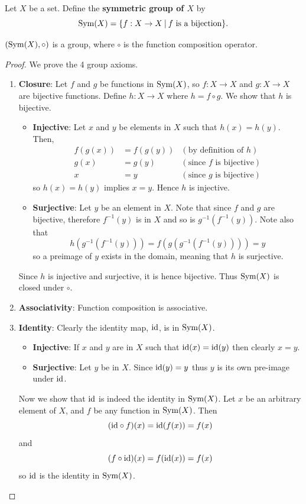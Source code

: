 \begin{definition}
    Let $X$ be a set. Define the \textbf{symmetric group of $X$} by
    \[
        \Sym{X} = \{f: X \to X \vert f \text{ is a bijection}\}.
    \]
\end{definition}
\begin{proposition}
    $(\mathrm{Sym}(X), \circ)$ is a group, where $\circ$ is the function composition operator.
\end{proposition}
\begin{proof}
    We prove the 4 group axioms.
    \begin{enumerate}
        \item \textbf{Closure}: Let $f$ and $g$ be functions in $\mathrm{Sym}(X)$, so $f: X\to X$ and $g:X \to X$ are bijective functions. Define $h:X \to X$ where $h = f\circ g$. We show that $h$ is bijective.
        \begin{itemize}
            \item \textbf{Injective}: Let $x$ and $y$ be elements in $X$ such that $h(x) = h(y)$. Then,
            \begin{align*}
                f(g(x)) &= f(g(y)) & (\text{by definition of } h)\\
                g(x) &= g(y) & (\text{since } f \text{ is bijective})\\
                x &= y & (\text{since } g \text{ is bijective})
            \end{align*}
            so $h(x) = h(y)$ implies $x = y$. Hence $h$ is injective.
            \item \textbf{Surjective}: Let $y$ be an element in $X$. Note that since $f$ and $g$ are bijective, therefore $f^{-1}(y)$ is in $X$ and so is $g^{-1}(f^{-1}(y))$. Note also that
            \[
                h(g^{-1}(f^{-1}(y))) = f(g(g^{-1}(f^{-1}(y)))) = y
            \]
            so a preimage of $y$ exists in the domain, meaning that $h$ is surjective.
        \end{itemize}
        Since $h$ is injective and surjective, it is hence bijective. Thus $\mathrm{Sym}(X)$ is closed under $\circ$.
        
        \item \textbf{Associativity}: Function composition is associative.
        
        \item \textbf{Identity}: Clearly the identity map, $\mathrm{id}$, is in $\mathrm{Sym}(X)$.
        \begin{itemize}
            \item \textbf{Injective}: If $x$ and $y$ are in $X$ such that $\mathrm{id}(x) = \mathrm{id}(y)$ then clearly $x = y$.
            \item \textbf{Surjective}: Let $y$ be in $X$. Since $\mathrm{id}(y) = y$ thus $y$ is its own pre-image under $\mathrm{id}$.
        \end{itemize}
        Now we show that $\mathrm{id}$ is indeed the identity in $\mathrm{Sym}(X)$. Let $x$ be an arbitrary element of $X$, and $f$ be any function in $\mathrm{Sym}(X)$. Then
        \[
            (\mathrm{id} \circ f)(x) = \mathrm{id}(f(x)) = f(x)
        \]
        and
        \[
            (f \circ \mathrm{id})(x) = f(\mathrm{id}(x)) = f(x)
        \]
        so $\mathrm{id}$ is the identity in $\mathrm{Sym}(X)$.
        

\end{enumerate}
\end{proof}
